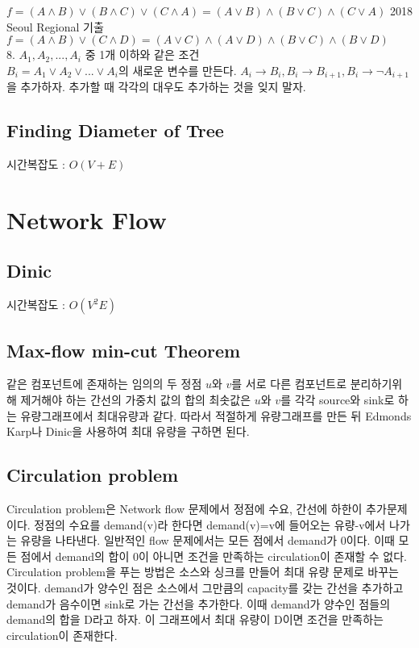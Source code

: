 \documentclass[10pt,landscape,a4paper,twocolumn]{article}
\begin{document}
$f=(A \land B) \lor (B \land C) \lor (C \land A) = (A \lor B) \land (B \lor C) \land (C \lor A)$ \hspace{1em} 2018 Seoul Regional 기출\\
$f=(A \land B) \lor (C \land D) = (A \lor C) \land (A \lor D) \land (B \lor C) \land (B \lor D)$\\
8. $A_1, A_2, ..., A_i$ 중 1개 이하와 같은 조건\\
$B_i=A_1 \lor A_2 \lor ... \lor A_i$의 새로운 변수를 만든다. $A_i \rightarrow B_i, B_i \rightarrow B_{i+1}, B_i \rightarrow \lnot A_{i+1}$을 추가하자. 추가할 때 각각의 대우도 추가하는 것을 잊지 말자.\\



\subsection{Finding Diameter of Tree}
시간복잡도 : $O(V+E)$



\section{Network Flow}
\subsection{Dinic}
시간복잡도 : $O(V^2E)$


\subsection{Max-flow min-cut Theorem}
\hspace{1em}같은 컴포넌트에 존재하는 임의의 두 정점 $u$와 $v$를 서로 다른 컴포넌트로 분리하기위해 제거해야 하는 간선의 가중치 값의 합의 최솟값은 $u$와 $v$를 각각 source와 sink로 하는 유량그래프에서 최대유량과 같다. 따라서 적절하게 유량그래프를 만든 뒤 Edmonds Karp나 Dinic을 사용하여 최대 유량을 구하면 된다.\\

\subsection{Circulation problem}
\hspace{1em}Circulation problem은 Network flow 문제에서 정점에 수요, 간선에 하한이 추가문제이다. 정점의 수요를 demand(v)라 한다면 demand(v)=v에 들어오는 유량-v에서 나가는 유량을 나타낸다. 일반적인 flow 문제에서는 모든 점에서 demand가 0이다. 이때 모든 점에서 demand의 합이 0이 아니면 조건을 만족하는 circulation이 존재할 수 없다. Circulation problem을 푸는 방법은 소스와 싱크를 만들어 최대 유량 문제로 바꾸는 것이다. demand가 양수인 점은 소스에서 그만큼의 capacity를 갖는 간선을 추가하고 demand가 음수이면 sink로 가는 간선을 추가한다. 이때 demand가 양수인 점들의 demand의 합을 D라고 하자. 이 그래프에서 최대 유량이 D이면 조건을 만족하는 circulation이 존재한다.
\end{document}

